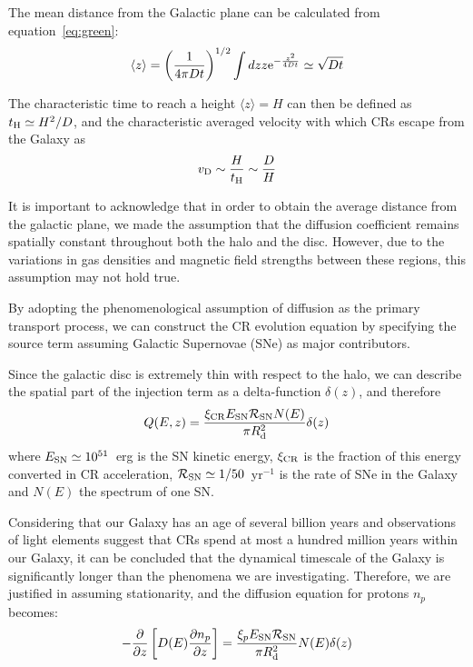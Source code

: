 The mean distance from the Galactic plane can be calculated from equation~\eqref{eq:green}:
%
\begin{equation}
\langle z \rangle = \left(\frac{1}{{4 \pi D t}}\right)^{1/2} \int dz z {\rm e}^{-\frac{z^2}{4Dt}} \simeq \sqrt{Dt}
\end{equation}

The characteristic time to reach a height $\langle z \rangle = H$ can then be defined as  $t_{\rm H} \simeq H^2 / D$, and the characteristic averaged velocity with which CRs escape from the Galaxy as
%
\begin{equation}
v_{\rm D} \sim \frac{H}{t_{\rm H}} \sim \frac{D}{H}
\end{equation}

It is important to acknowledge that in order to obtain the average distance from the galactic plane, we made the assumption that the diffusion coefficient remains spatially constant throughout both the halo and the disc. However, due to the variations in gas densities and magnetic field strengths between these regions, this assumption may not hold true.

By adopting the phenomenological assumption of diffusion as the primary transport process, we can construct the CR evolution equation by specifying the source term assuming Galactic Supernovae (SNe) as major contributors.

Since the galactic disc is extremely thin with respect to the halo, we can describe the spatial part of the injection term as a delta-function $\delta(z)$, and therefore
%
\begin{equation}
Q(E,z) = \frac{\xi_{\rm CR} E_{\rm SN} \mathcal R_{\rm SN} N(E)}{\pi R_{\rm d}^2} \delta(z) 
\end{equation}
%
where $E_{\rm SN} \simeq 10^{51}$~erg is the SN kinetic energy, $\xi_{\rm CR}$ is the fraction of this energy converted in CR acceleration, $\mathcal R_{\rm SN} \simeq 1 / 50$~yr$^{-1}$ is the rate of SNe in the Galaxy and $N(E)$ the spectrum of one SN. 

Considering that our Galaxy has an age of several billion years and observations of light elements suggest that CRs spend at most a hundred million years within our Galaxy, it can be concluded that the dynamical timescale of the Galaxy is significantly longer than the phenomena we are investigating. Therefore, we are justified in assuming stationarity, and the diffusion equation for protons $n_p$ becomes:
%
\begin{equation}
-\frac{\partial}{\partial z}\left[ D(E) \frac{\partial n_p}{\partial z}\right] = \frac{\xi_p E_{\rm SN} \mathcal R_{\rm SN}}{\pi R_{\rm d}^2} N(E) \delta(z)
\label{eq:protons}
\end{equation}

